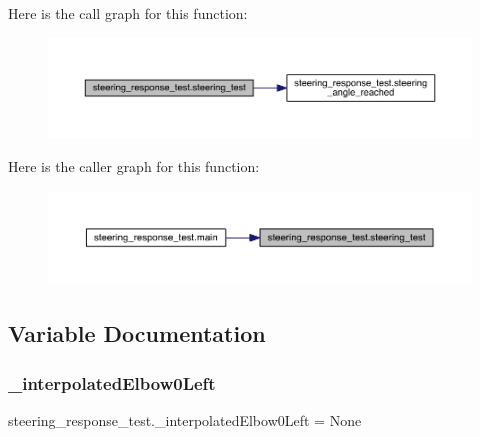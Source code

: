 \begin{DoxyCode}{0}
\end{DoxyCode}
Here is the call graph for this function\+:\nopagebreak
\begin{figure}[H]
\begin{center}
\leavevmode
\includegraphics[width=350pt]{namespacesteering__response__test_a47db8892f945cf998a098d03b6dbf3e6_cgraph}
\end{center}
\end{figure}
Here is the caller graph for this function\+:\nopagebreak
\begin{figure}[H]
\begin{center}
\leavevmode
\includegraphics[width=350pt]{namespacesteering__response__test_a47db8892f945cf998a098d03b6dbf3e6_icgraph}
\end{center}
\end{figure}


\subsection{Variable Documentation}
\mbox{\label{namespacesteering__response__test_aa99d269120559745156b131a845a5007}} 
\subsubsection{\texorpdfstring{\_interpolatedElbow0Left}{\_interpolatedElbow0Left}}
{\footnotesize\ttfamily steering\+\_\+response\+\_\+test.\+\_\+interpolated\+Elbow0\+Left = None\hspace{0.3cm}{\ttfamily [private]}}



